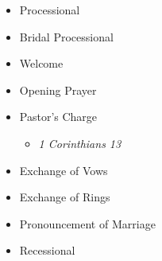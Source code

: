 \documentclass[12pt]{article}
\begin{document}
\begin{minipage}[t]{0.495\textwidth}
\centering

\vspace{2.5cm}

\vspace{0.2cm}


















\begin{itemize}
\item [] Processional
\item [] Bridal Processional
\item [] Welcome
\item [] Opening Prayer

\item [] Pastor's Charge
\begin{itemize}[topsep=-5pt,itemsep=-1ex,partopsep=1ex,parsep=1ex]
\item [] \textit{1 Corinthians 13}
\end{itemize}

\item [] Exchange of Vows
\item [] Exchange of Rings
\item [] Pronouncement of Marriage
\item [] Recessional
\end{itemize}

\end{minipage}
\end{document}
